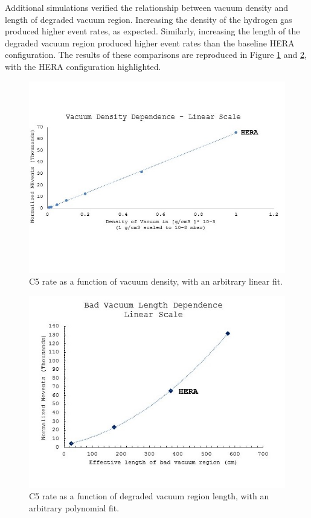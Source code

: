 Additional simulations verified the relationship between vacuum density and length of degraded vacuum region.  Increasing the density of the hydrogen gas produced higher event rates, as expected.  Similarly, increasing the length of the degraded vacuum region produced higher event rates than the baseline HERA configuration.  The results of these comparisons are reproduced in Figure \ref{fig:hera5} and \ref{fig:hera6}, with the HERA configuration highlighted.

\begin{figure}
	\centering
	\includegraphics[width=.75\textwidth]{../../img/density_dep_lin_crop.jpg}
	\caption {C5 rate as a function of vacuum density, with an arbitrary linear fit.}
	\label{fig:hera5}
\end{figure}	
		
\begin{figure}
	\centering	\includegraphics[width=.75\textwidth]{../../img/length_dep_poly_crop.jpg}	
	\caption {C5 rate as a function of degraded vacuum region length, with an arbitrary polynomial fit.}
	\label{fig:hera6}
\end{figure}




